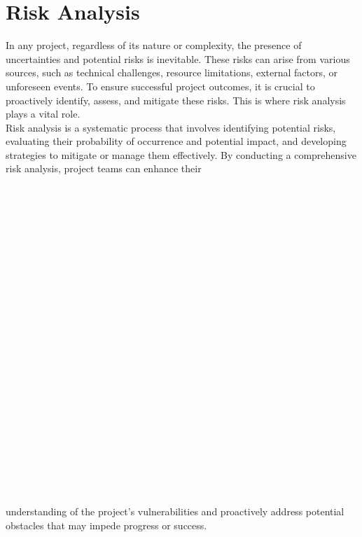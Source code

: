 \documentclass[eng]{class}
\begin{document}
\section{Risk Analysis}
In any project, regardless of its nature or complexity, the presence of uncertainties and potential risks is inevitable.
These risks can arise from various sources, such as technical challenges, resource limitations, external factors, or unforeseen events.
To ensure successful project outcomes, it is crucial to proactively identify, assess, and mitigate these risks. This is where risk analysis plays a vital role.\\
Risk analysis is a systematic process that involves identifying potential risks, evaluating their probability of occurrence and potential impact,
and developing strategies to mitigate or manage them effectively. By conducting a comprehensive risk analysis,
project teams can enhance their
\\
\\
\\
\\
\\
\\
\\
\\
\\
\\
\\
\\
\\
\\
\\
\\
\\
\\
\\
\\
\\
\\
\\
\\
\\
understanding of the project's vulnerabilities and proactively address potential obstacles that may impede progress or success.\\
\end{document}
